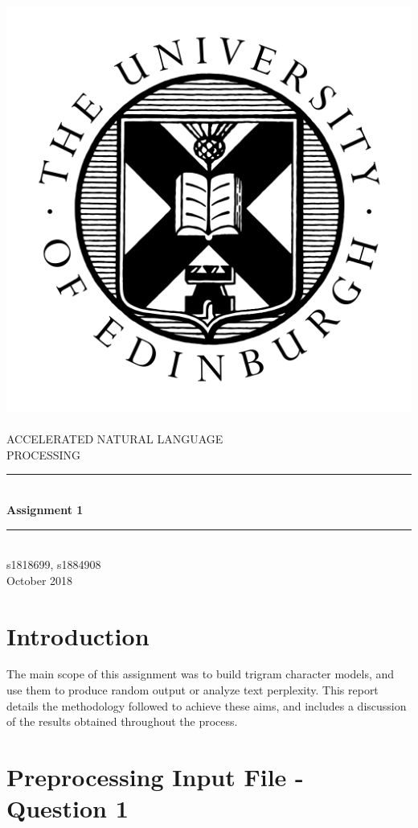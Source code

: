 \documentclass[12pt]{article}
\begin{document}
	
	
\begin{titlepage}
	\newcommand{\HRule}{\rule{\linewidth}{0.5mm}} %
	\center %
	\includegraphics[width = 0.3 \linewidth]{"./graphics/avatar-roundel-blackonwhite"}\\[0.5cm]
	\textsc{\\[1cm]\LARGE ACCELERATED NATURAL LANGUAGE \\
             \hfill\break PROCESSING}\\[2cm]

	\HRule \\[0.4cm]
	{ \huge \bfseries Assignment 1}\\[0.1cm]
	\HRule \\[1.5cm]
	\Large
	\vfill
	 s1818699, s1884908\\[0.5cm]
	{\large October 2018}
\end{titlepage}
\setlength\parindent{0pt}		
\newpage

\tableofcontents

\newpage
	
\section{Introduction}
The main scope of this assignment was to build trigram character models, and use them to produce random output or analyze text perplexity.  This report details the methodology followed to achieve these aims, and includes a discussion of the results obtained throughout the process.
\section{Preprocessing Input File - Question 1}
\label{PreProc}
\end{document}
